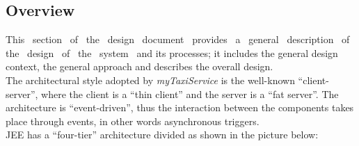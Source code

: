\documentclass[a4paper,11pt]{report} %
\newcommand{\mts}{\mbox{\normalfont\itshape myTaxiService}}
\begin{document}
	\subsection{Overview} This  section  of  the  design  document  provides  a  general  description  of  the  design  of  the  system  and  its  processes;  it includes  the  general  design  context,  the  general  approach  and  describes  the overall design.\\
	The architectural style adopted by \mts{} is the well-known ``client-server'', where the client is a ``thin client'' and the server is a ``fat server''. The architecture is ``event-driven'', thus the interaction between the components takes place through events, in other words asynchronous triggers. \\	
	JEE has a ``four-tier'' architecture divided as shown in the picture below:\\
		\begin{minipage}{\linewidth}
		\end{minipage}	
\end{document}
